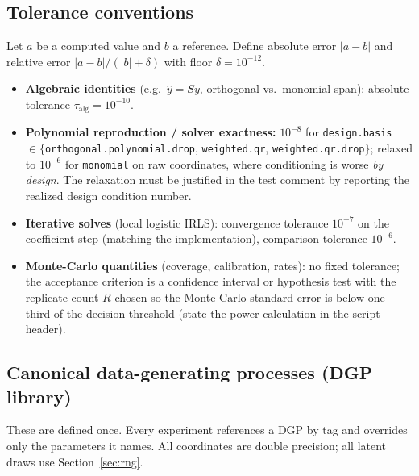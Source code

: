 \documentclass[11pt]{article}
\newcommand{\code}[1]{\texttt{#1}}
\begin{document}
\subsection{Tolerance conventions}
\label{sec:tol}

Let $a$ be a computed value and $b$ a reference. Define absolute error $|a-b|$ and relative
error $|a-b|/(|b|+\delta)$ with floor $\delta=10^{-12}$.

\begin{itemize}[leftmargin=1.4em]
\item \textbf{Algebraic identities} (e.g.\ $\hat y = Sy$, orthogonal vs.\ monomial span):
absolute tolerance $\tau_{\mathrm{alg}}=10^{-10}$.
\item \textbf{Polynomial reproduction / solver exactness:} $10^{-8}$ for
\code{design.basis} $\in\{$\code{orthogonal.polynomial.drop}, \code{weighted.qr},
\code{weighted.qr.drop}$\}$; relaxed to $10^{-6}$ for \code{monomial} on raw coordinates,
where conditioning is worse \emph{by design}. The relaxation must be justified in the test
comment by reporting the realized design condition number.
\item \textbf{Iterative solves} (local logistic IRLS): convergence tolerance $10^{-7}$ on
the coefficient step (matching the implementation), comparison tolerance $10^{-6}$.
\item \textbf{Monte-Carlo quantities} (coverage, calibration, rates): no fixed tolerance;
the acceptance criterion is a confidence interval or hypothesis test with the replicate
count $R$ chosen so the Monte-Carlo standard error is below one third of the decision
threshold (state the power calculation in the script header).
\end{itemize}

\subsection{Canonical data-generating processes (DGP library)}
\label{sec:dgp}

These are defined once. Every experiment references a DGP by tag and overrides only the
parameters it names. All coordinates are double precision; all latent draws use
Section~\ref{sec:rng}.
\end{document}
